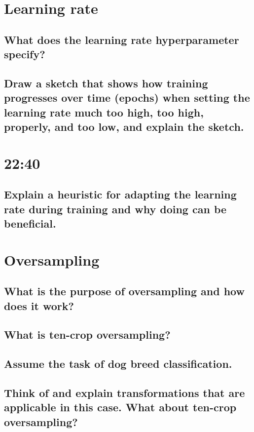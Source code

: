 \section{Learning rate}

\subsection{What does the learning rate hyperparameter specify?}

\subsection{Draw a sketch that shows how training progresses over time (epochs) when setting the learning rate much too high, too high, properly, and too low, and explain the sketch.}

\subsubsection{ }
\section{22:40}

\subsection{Explain a heuristic for adapting the learning rate during training and why doing can be beneficial.}

\section{Oversampling}

\subsection{What is the purpose of oversampling and how does it work?}

\subsection{What is ten-crop oversampling?}

\subsection{Assume the task of dog breed classification.}

\subsection{Think of and explain transformations that are applicable in this case. What about ten-crop oversampling?}

